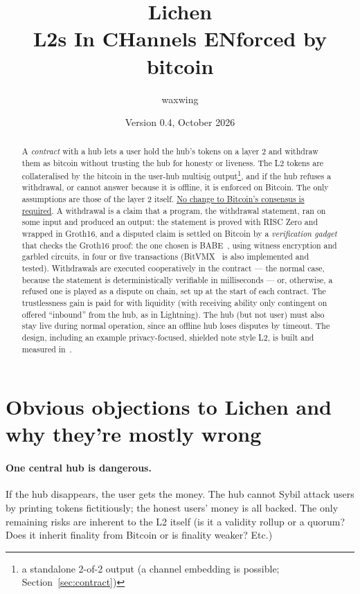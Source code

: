\documentclass[11pt]{article}
\title{\textbf{Lichen}\\L2s In CHannels ENforced by bitcoin}
\author{waxwing}
\date{Version 0.4, October 2026}
\begin{document}
\maketitle

\begin{abstract}
A \emph{contract} with a hub lets a user hold the hub's tokens on a layer 2 and
withdraw them as bitcoin without trusting the hub for honesty or liveness. The L2 tokens are collateralised by the bitcoin in the user-hub multisig output\footnote{a standalone 2-of-2 output (a channel embedding is possible; Section~\ref{sec:contract})}, and if the hub refuses a withdrawal, or cannot answer because it is offline, it is enforced on Bitcoin. The only assumptions are those of the layer 2 itself. \underline{No change to Bitcoin's
consensus is required}. A withdrawal is a claim that a program, the withdrawal statement, ran on some input and produced an output: the statement is proved with RISC Zero and wrapped in Groth16, and a disputed claim is settled on Bitcoin by a \emph{verification gadget} that checks the Groth16 proof: the one chosen is BABE~\cite{babe}, using witness encryption and garbled circuits, in four or five transactions (BitVMX~\cite{bitvmx} is also implemented and tested).  Withdrawals are executed cooperatively in the contract --- the normal case, because the statement is deterministically verifiable in milliseconds --- or, otherwise, a refused one is played as a dispute on chain, set up at the start of each contract. The trustlessness gain is paid for with liquidity (with receiving ability only contingent on offered ``inbound'' from the hub, as in Lightning). The hub (but not user) must also stay live during normal operation, since an offline hub loses disputes by timeout. The design, including an example privacy-focused, shielded note style L2, is built and measured in~\cite{lichencode}.
\end{abstract}

\tableofcontents


\section{Obvious objections to Lichen and why they're mostly wrong}

\paragraph{One central hub is dangerous.} If the hub disappears, the user gets the money. The hub cannot Sybil attack users by printing tokens fictitiously; the honest users' money is all backed. The only remaining risks are inherent to the L2 itself (is it a validity rollup or a quorum? Does it inherit finality from Bitcoin or is finality weaker? Etc.)
\end{document}

